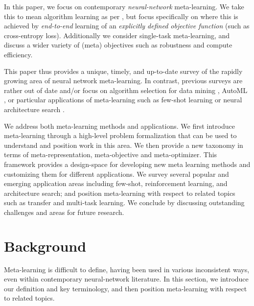 \documentclass[10pt,journal,compsoc]{IEEEtran}
\newcommand{\cut}[1]{}
\begin{document}
In this paper, we focus on contemporary \emph{neural-network} meta-learning. We take this to mean algorithm learning as per \cite{thrun1998lifelong,vilalta2002perspective}, but focus specifically on where this is achieved by \emph{end-to-end} learning of an \emph{explicitly defined objective function} (such as cross-entropy loss). Additionally we consider single-task meta-learning, and discuss a wider variety of (meta) objectives such as robustness and compute efficiency.

This paper thus provides a unique, timely, and up-to-date survey of the rapidly growing area of neural network meta-learning. In contrast, previous surveys are rather out of date and/or focus on algorithm selection for data mining \cite{vilalta2002perspective, pan2009transfer_survey, lemke2015metalearning,  vanschoren2018metasurvey}, AutoML \cite{yao2018automl,hutter2019autoMLbook}, or particular applications of meta-learning such as few-shot learning \cite{wang2019fewshotsurvey} or neural architecture search \cite{elsken2019nas}.

We address both meta-learning methods and applications. We first introduce meta-learning through a high-level problem formalization that can be used to understand and position work in this area. We then provide a new taxonomy in terms of meta-representation, meta-objective and meta-optimizer. This framework provides a design-space for developing new meta learning methods and customizing them for different applications. We survey several popular and emerging application areas including few-shot, reinforcement learning, and architecture search; and position meta-learning with respect to related topics such as transfer and multi-task learning. We conclude by discussing outstanding challenges and areas for future research.

\cut{}

\section{Background}


Meta-learning is difficult to define, having been used in various inconsistent ways, even within contemporary neural-network literature. In this section, we introduce our definition and key terminology, and then position meta-learning with respect to related topics. 
\end{document}
